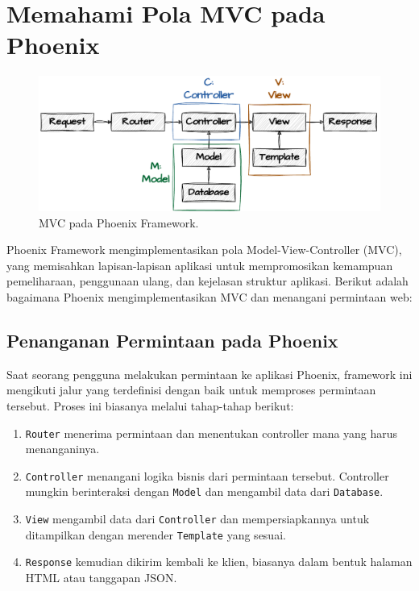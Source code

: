 \section{Memahami Pola MVC pada Phoenix}

\begin{figure}[h]
	\begin{center}
		\includegraphics[width=1\textwidth]{../assets/phoenix-mvc.pdf}
	\end{center}
	\caption{MVC pada Phoenix Framework.}
\end{figure}

Phoenix Framework mengimplementasikan pola Model-View-Controller (MVC), yang memisahkan lapisan-lapisan aplikasi untuk mempromosikan kemampuan pemeliharaan, penggunaan ulang, dan kejelasan struktur aplikasi. Berikut adalah bagaimana Phoenix mengimplementasikan MVC dan menangani permintaan web:

\subsection{Penanganan Permintaan pada Phoenix}
Saat seorang pengguna melakukan permintaan ke aplikasi Phoenix, framework ini mengikuti jalur yang terdefinisi dengan baik untuk memproses permintaan tersebut. Proses ini biasanya melalui tahap-tahap berikut:
\begin{enumerate}
	\item \texttt{Router} menerima permintaan dan menentukan controller mana yang harus menanganinya.
	\item \texttt{Controller} menangani logika bisnis dari permintaan tersebut. Controller mungkin berinteraksi dengan \texttt{Model} dan mengambil data dari \texttt{Database}.
	\item \texttt{View} mengambil data dari \texttt{Controller} dan mempersiapkannya untuk ditampilkan dengan merender \texttt{Template} yang sesuai.
	\item \texttt{Response} kemudian dikirim kembali ke klien, biasanya dalam bentuk halaman HTML atau tanggapan JSON.
\end{enumerate}


